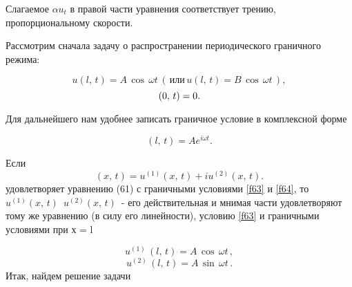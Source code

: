 \documentclass[a4paper, 12pt]{article}
\begin{document}
Слагаемое $\alpha u_t$ в правой части уравнения соответствует трению, пропорциональному скорости. 

Рассмотрим сначала задачу о распространении периодического граничного режима:

\begin{equation} \label{f62}
u(l,\,t)= A\,\cos\, \omega t\, (\, \text{или}\, u(l,\,t)    = B\,\cos\, \omega t\,), 
\end{equation}
\begin{equation} \label{f63}
(0,\,t)= 0.    \setcounter{equation}{63} 
\end{equation}

Для дальнейшего нам удобнее записать граничное условие в комплексной форме

\begin{equation} \label{f64}(l,\,t)= Ae^{i\omega t}.
\end{equation}

Если \begin{displaymath} (x,\,t)= u^{(1)}(x,\,t)+iu^{(2)}(x,\,t).
\end{displaymath}
удовлетворяет уравнению  (61) с граничными условиями \eqref{f63} и \eqref{f64}, то \, \(u^{(1)} (x,\,t)\)\,   \(u^{(2)} (x,\,t)\)\,  - его действительная и мнимая части удовлетворяют тому же уравнению (в силу его линейности), условию \eqref{f63} и граничными условиями при х = l

\begin{displaymath} u^{(1)}\,(l,\,t) =A\,\cos\, \omega t\,,\end{displaymath}
\begin{displaymath}
u^{(2)}\,(l,\,t) =A\,\sin\, \omega t\,.
\end{displaymath}
Итак, найдем решение задачи
\end{document}
